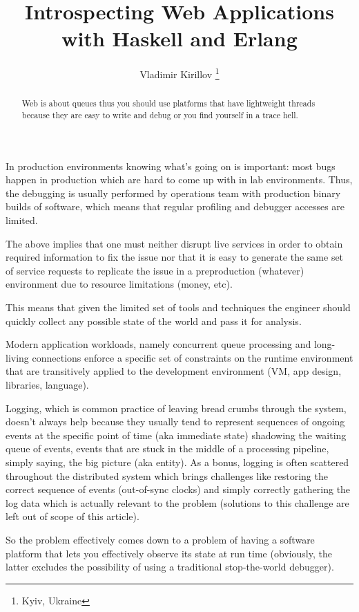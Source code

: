 \documentclass[10pt, a5paper]{article}
\begin{document}
\title{Introspecting Web Applications with Haskell and Erlang}
\author{Vladimir Kirillov \footnote{Kyiv, Ukraine}}
\maketitle

\begin{abstract}
Web is about queues thus you should use platforms that have lightweight threads because they are easy to write and debug or you find yourself in a trace hell.
\end{abstract}

In production environments knowing what's going on is important: most bugs happen in production which are hard to come up with in lab environments. Thus, the debugging is usually performed by operations team with production binary builds of software, which means that regular profiling and debugger accesses are limited.

The above implies that one must neither disrupt live services in order to obtain required information to fix the issue nor that it is easy to generate the same set of service requests to replicate the issue in a preproduction (whatever) environment due to resource limitations (money, etc).

This means that given the limited set of tools and techniques the engineer should quickly collect any possible state of the world and pass it for analysis.

Modern application workloads, namely concurrent queue processing and long-living connections enforce a specific set of constraints on the runtime environment that are transitively applied to the development environment (VM, app design, libraries, language).

Logging, which is  common practice of leaving bread crumbs through the system, doesn't always help because they usually tend to represent sequences of ongoing events at the specific point of time (aka immediate state) shadowing the waiting queue of events, events that are stuck in the middle of a processing pipeline, simply saying, the big picture (aka entity). As a bonus, logging is often scattered throughout the distributed system which brings challenges like restoring the correct sequence of events (out-of-sync clocks) and simply correctly gathering the log data which is actually relevant to the problem (solutions to this challenge are left out of scope of this article).

So the problem effectively comes down to a problem of having a software platform that lets you effectively observe its state at run time (obviously, the latter excludes the possibility of using a traditional stop-the-world debugger).
\end{document}
